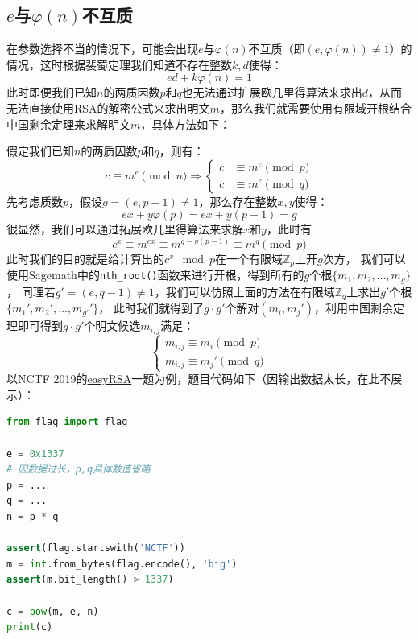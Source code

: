 \documentclass{book}
\numberwithin{equation}{subsubsection}
\begin{document}
\subsection{$e$与$\varphi(n)$不互质}
在参数选择不当的情况下，可能会出现$e$与$\varphi(n)$不互质（即$(e,\varphi(n))\neq1$）的情况，这时根据裴蜀定理我们知道不存在整数$k,d$使得：
\begin{equation}
    ed+k\varphi(n)=1
    \nonumber
\end{equation}
此时即便我们已知$n$的两质因数$p$和$q$也无法通过扩展欧几里得算法来求出$d$，从而无法直接使用RSA的解密公式来求出明文$m$，那么我们就需要使用有限域开根结合中国剩余定理来求解明文$m$，具体方法如下：\par
假定我们已知$n$的两质因数$p$和$q$，则有：
\begin{equation}
    c\equiv m^e\pmod{n}\Rightarrow
    \begin{cases}
        c&\equiv m^e\pmod{p}\\
        c&\equiv m^e\pmod{q}
    \end{cases}
    \nonumber
\end{equation}
先考虑质数$p$，假设$g=(e,p-1)\neq 1$，那么存在整数$x, y$使得：
\begin{equation}
    ex+y\varphi(p)=ex+y(p-1)=g
    \nonumber
\end{equation}
很显然，我们可以通过拓展欧几里得算法来求解$x$和$y$，此时有
\begin{equation}
    c^x\equiv m^{ex}\equiv m^{g-y(p-1)}\equiv m^g\pmod{p}
    \nonumber
\end{equation}
此时我们的目的就是给计算出的$c^x\mod{p}$在一个有限域$\mathbb{Z}_p$上开$g$次方，
我们可以使用Sagemath中的\texttt{nth\_root()}函数来进行开根，得到所有的$g$个根$\{m_1,m_2,\ldots,m_g\}$，
同理若$g'=(e,q-1)\neq 1$，我们可以仿照上面的方法在有限域$\mathbb{Z}_q$上求出$g'$个根$\{m_1',m_2',\ldots,m_{g'}'\}$，
此时我们就得到了$g\cdot g'$个解对$(m_i,m_j')$，利用中国剩余定理即可得到$g\cdot g'$个明文候选$m_{i,j}$满足：
\begin{equation}
    \begin{cases}
        m_{i,j}\equiv m_i\pmod{p}\\
        m_{i,j}\equiv m_j'\pmod{q}
    \end{cases}
    \nonumber
\end{equation}
以NCTF 2019的\href{https://www.nssctf.cn/problem/1288}{easyRSA}一题为例，题目代码如下（因输出数据太长，在此不展示）：
\begin{lstlisting}[language=Python,basicstyle=\ttfamily,breaklines=true,keywordstyle=\bfseries\color{blue}]
from flag import flag

e = 0x1337
# 因数据过长，p,q具体数值省略
p = ...
q = ...
n = p * q

assert(flag.startswith('NCTF'))
m = int.from_bytes(flag.encode(), 'big')
assert(m.bit_length() > 1337)

c = pow(m, e, n)
print(c)
\end{lstlisting}
\end{document}
